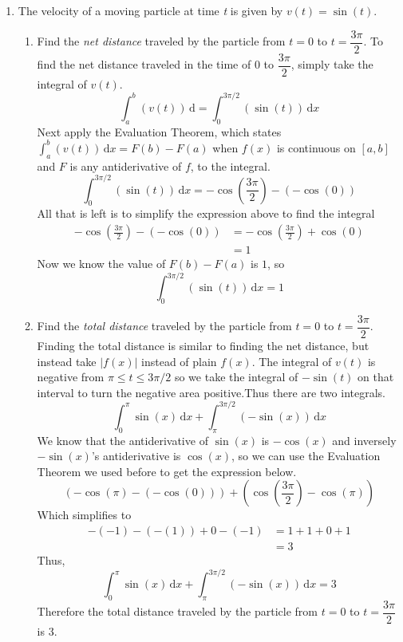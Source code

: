 \documentclass{article}
\begin{document}
\begin{enumerate}[label=\textbf{(1.\arabic*)}] %

\item The velocity of a moving particle at time \textit{t} is given by $v(t)=\sin(t)$. %
\begin{enumerate}[label=\textbf{(\alph*)}]
\item Find the \textit{net distance} traveled by the particle from $t=0$ to $t=\dfrac{3\pi}{2}$. %
To find the net distance traveled in the time of 0 to $\dfrac{3\pi}{2}$, simply take the integral of $v(t)$.
\[ \int_a^b\!(v(t))\,\text{d}   =   \int_0^{3\pi/2}\!(\sin(t))\,\text{d}x\]
Next apply the Evaluation Theorem, which states $ \int_{a}^b \! (v(t)) \, \text{d}x=F(b)-F(a)$ when $f(x)$ is continuous on $[a,b]$ and $F$ is any antiderivative of $f$, to the integral.
\[\int_0^{3\pi/2}\!(\sin(t))\,\text{d}x   =   -\cos\left(\frac{3\pi}{2}\right)-\left(-\cos\left(0\right)\right)\]
All that is left is to simplify the expression above to find the integral
\begin{align*}
-\cos\left(\frac{3\pi}{2}\right)-\left(-\cos\left(0\right)\right)&=-\cos\left(\frac{3\pi}{2}\right)+\cos\left(0\right) \\
&= 1
\end{align*}
Now we know the value of $F(b)-F(a)$ is $1$, so
\[\int_0^{3\pi/2}\!(\sin(t))\,\text{d}x = 1\]

\item Find the \textit{total distance} traveled by the particle from $t=0$ to $t=\dfrac{3\pi}{2}$. %
Finding the total distance is similar to finding the net distance, but instead take $|f(x)|$ instead of plain $f(x)$. The integral of $v(t)$ is negative from $\pi\le t\le3\pi/2$ so we take the integral of $-\sin(t)$ on that interval to turn the negative area positive.Thus there are two integrals.
\[\int_0^\pi \! \sin(x) \, \text{d}x + \int_\pi^{3\pi/2}\! \left(-\sin(x)\right) \, \text{d}x\]
We know that the antiderivative of $\sin(x)$ is $-\cos(x)$ and inversely $-\sin(x)$'s antiderivative is $\cos(x)$, so we can use the Evaluation Theorem we used before to get the expression below.
\[\left(-\cos\left(\pi\right)-\left(-\cos\left(0\right)\right)\right)+\left(\cos\left(\frac{3\pi}{2}\right)-\cos\left(\pi\right)\right)\]
Which simplifies to
\begin{align*}
-(-1 )-(-(1))+0-(-1)&=1+1+0+1 \\
&= 3
\end{align*}
Thus, 
\[\int_0^\pi \! \sin(x) \, \text{d}x + \int_\pi^{3\pi/2}\! \left(-\sin(x)\right) \, \text{d}x=3\]
Therefore the total distance traveled by the particle from $t=0$ to $t=\dfrac{3\pi}{2}$ is 3.
\end{enumerate}


\end{enumerate}
\end{document}
